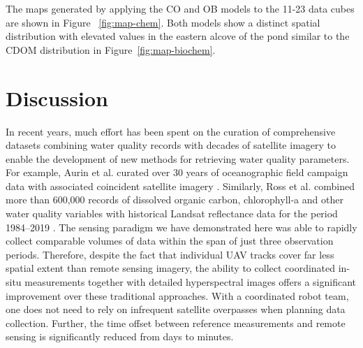 \documentclass[remotesensing,article,submit,pdftex,moreauthors]{Definitions/mdpi}
\begin{document}
The maps generated by applying the CO and OB models to the 11-23 data cubes are shown in Figure ~\ref{fig:map-chem}. Both models show a distinct spatial distribution with elevated values in the eastern alcove of the pond similar to the CDOM distribution in Figure~\ref{fig:map-biochem}.






\section{Discussion} \label{sec:discussion}

In recent years, much effort has been spent on the curation of comprehensive datasets combining water quality records with decades of satellite imagery to enable the development of new methods for retrieving water quality parameters. For example, Aurin et al. curated over 30 years of oceanographic field campaign data with associated coincident satellite imagery \cite{aurin2018remote}. Similarly, Ross et al. combined more than 600,000 records of dissolved organic carbon, chlorophyll-a and other water quality variables with historical Landsat reflectance data for the period 1984--2019 \cite{ross2019aquasat}. The sensing paradigm we have demonstrated here was able to rapidly collect comparable volumes of data within the span of just three observation periods. Therefore, despite the fact that individual UAV tracks cover far less spatial extent than remote sensing imagery, the ability to collect coordinated in-situ measurements together with detailed hyperspectral images offers a significant improvement over these traditional approaches. With a coordinated robot team, one does not need to rely on infrequent satellite overpasses when planning data collection. Further, the time offset between reference measurements and remote sensing is significantly reduced from days to minutes.
\end{document}

